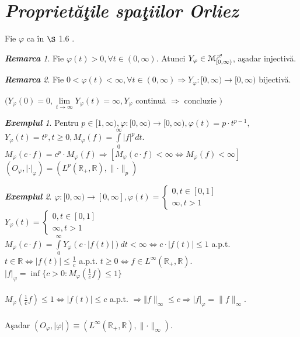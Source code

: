 \documentclass[ a4paper, 12pt]{report}
\theoremstyle{definition}
\theoremstyle{remark}
\newtheorem{remarc}{\bf Remarca}[section]
\newtheorem{exemple}{\bf Exemplul}[section]
\numberwithin{equation}{section}
\begin{document}
\section{\textit{Propriet\u a\c tile spa\c tiilor Orliez}}
Fie $\varphi$ ca \^in $\S$ 1.6 .\\
\begin{remarc}
Fie $\varphi(t)>0, \forall t \in (0,\infty)$. Atunci  $Y_\varphi \in \mathcal{M}_{[0,\infty)}^{\mc}$, a\c sadar injectiv\u a.
\end{remarc}
\begin{remarc}
Fie $0<\varphi(t) < \infty, \forall t \in (0,\infty) \Rightarrow Y_\varphi : [0,\infty) \rightarrow [0,\infty)$ bijectiv\u a.
\end{remarc}
$\big(Y_\varphi(0) = 0, \lim\limits_{t \rightarrow \infty} Y_\varphi(t) = \infty, Y_\varphi$ continu\u a $ \Rightarrow$ concluzie $\big)$
\begin{exemple}
Pentru $p \in [1,\infty), \varphi : [0,\infty) \rightarrow [0,\infty), \varphi(t) = p \cdot t^{p-1},$\\
$Y_\varphi(t) = t^p, t \geq 0, M_\varphi(f) = \int\limits_{0}^{\infty}\lvert f \rvert^p dt.$\\
$M_\varphi(c \cdot f) = c^p \cdot M_\varphi(f) \Rightarrow [M_\varphi(c \cdot f) < \infty \Leftrightarrow M_\varphi(f) < \infty]$\\
$(O_\varphi, \lvert \cdot \rvert_\varphi) = (L^p(\mathbb{R}_+, \mathbb{R}), \lVert \cdot \rVert_p)$
\end{exemple}
\begin{exemple}
$\varphi : [0,\infty) \rightarrow [0,\infty] , \varphi(t) = \begin{cases}
0,t \in [0,1]\\
\infty, t>1
\end{cases}$\\
$Y_\varphi(t) = \begin{cases}
0,t \in [0,1]\\
\infty, t>1
\end{cases}$\\

$M_\varphi(c \cdot f) = \int\limits_{0}^{\infty} Y_\varphi(c \cdot \lvert f(t) \rvert) dt < \infty \Leftrightarrow c \cdot \lvert f(t) \rvert \leq 1$ a.p.t. $t \in \mathbb{R} \Leftrightarrow \lvert f(t) \rvert \leq \frac{1}{c}$ a.p.t. $t \geq 0 \Leftrightarrow f \in L^{\infty}(\mathbb{R}_+,\mathbb{R}).$\\
$\lvert f \rvert_\varphi = \inf\{c>0:M_\varphi(\frac{1}{c}f) \leq 1\}$\\
\\
$M_\varphi(\frac{1}{c}f) \leq 1 \Leftrightarrow \lvert f(t) \rvert \leq c$  a.p.t. $\Rightarrow \Vert f \rVert_{\infty} \leq c \Rightarrow \lvert f\rvert_\varphi = \lVert f \rVert_{\infty}$.\\
\\
A\c sadar $ (O_\varphi, \lvert \varphi \rvert) \equiv (L^\infty(\mathbb{R}_+, \mathbb{R}),\lVert \cdot \rVert_\infty).$
\end{exemple}
\end{document}
